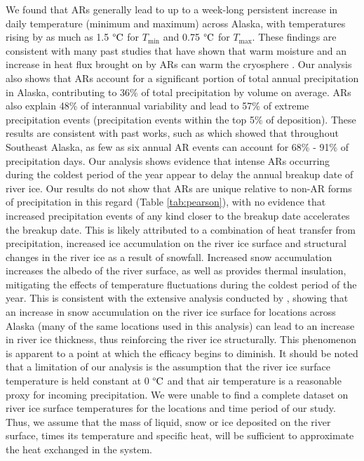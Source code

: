 \documentclass[12pts,draft]{AR_analysis_}
\begin{document}
We found that ARs generally lead to up to a week-long persistent 
increase in daily temperature (minimum and maximum) across Alaska, with 
temperatures rising by as much as 1.5 $\mathrm{\degree C}$ 
for $T_{\text{min}}$ and 0.75 $\mathrm{\degree C}$ for $T_{\text{max}}$. 
These findings are consistent with  
many past studies that have shown that warm moisture and an increase 
in heat flux brought on by ARs can 
warm the cryosphere
\cite{Wille2021, Ma2023, ARs_lead_to_sea_ice_loss, Zhang2023}.
Our analysis also shows that ARs account for a significant portion of
total annual precipitation 
in Alaska, contributing to 36\% of total precipitation by volume on 
average. ARs also explain 48\% 
of interannual variability and lead to 57\% of extreme precipitation events 
(precipitation events within the top 5\% of deposition). These results are
consistent with past works, such as  which showed that 
throughout Southeast Alaska, as few as six annual AR events can account for 
68\% - 91\% of precipitation days. Our analysis shows evidence that intense 
ARs occurring during the coldest period of the year appear to delay the 
annual breakup date of river ice. Our results do not show that ARs are 
unique relative to non-AR forms of 
precipitation in this regard (Table \ref{tab:pearson}), with no evidence 
that increased 
precipitation events of any kind closer to the breakup date accelerates the 
breakup date.
This is likely attributed to a combination of heat transfer from 
precipitation, increased ice accumulation on the river ice surface 
and structural changes in the river ice as a result 
of snowfall.
Increased snow accumulation
increases the albedo of the river surface, as well as provides thermal
insulation, mitigating the effects of temperature 
fluctuations during the coldest period of the year. This is 
consistent with the extensive analysis conducted by , 
showing that an increase in snow accumulation on the river ice surface 
for locations across Alaska (many of the same locations used in this 
analysis) can lead to 
an increase in river ice thickness, thus reinforcing the river ice 
structurally. This phenomenon is apparent to a point at which the efficacy 
begins to diminish. It should be noted that a limitation of
our analysis is the assumption that the river ice surface temperature is 
held constant at 0 $\mathrm{\degree C}$ and that air temperature is a 
reasonable proxy for
incoming precipitation. We were unable to 
find a complete dataset on river ice surface temperatures for the locations and time 
period of our study. Thus, we assume that the mass of liquid, snow or ice deposited on 
the river surface, times its temperature and specific heat, will be sufficient to
approximate the heat exchanged in the system.   
\end{document}
